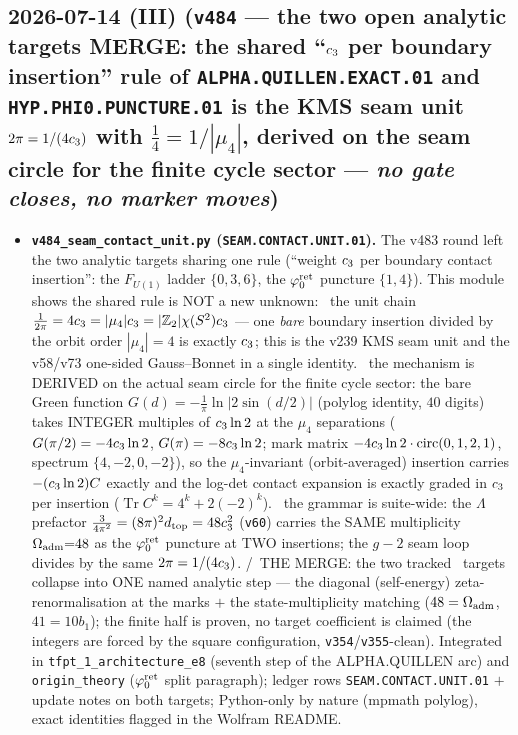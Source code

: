 \subsection*{2026-07-14 (III) (\texttt{v484} --- the two open analytic targets MERGE: the shared ``$c_3$ per boundary insertion'' rule of \texttt{ALPHA.QUILLEN.EXACT.01} and \texttt{HYP.PHI0.PUNCTURE.01} is the KMS seam unit $2\pi=1/(4c_3)$ with $\tfrac14=1/|\mu_4|$, derived on the seam circle for the finite cycle sector --- \emph{no gate closes, no marker moves})}
\begin{itemize}[leftmargin=1.5em]
\item \textbf{\texttt{v484\_seam\_contact\_unit.py} (\texttt{SEAM.CONTACT.UNIT.01}).} The v483 round left
the two analytic targets sharing one rule (``weight $c_3$ per boundary contact insertion'': the
$F_{U(1)}$ ladder $\{0,3,6\}$, the $\varphi_0^{\mathrm{ret}}$ puncture $\{1,4\}$). This module shows the shared rule is NOT
a new unknown: \mE\ the unit chain $\tfrac1{2\pi}=4c_3=|\mu_4|c_3=|\mathbb{Z}_2|\chi(S^2)c_3$ ---
one \emph{bare} boundary insertion divided by the orbit order $|\mu_4|{=}4$ is exactly $c_3$; this is
the v239 KMS seam unit and the v58/v73 one-sided Gauss--Bonnet in a single identity. \mE\ the mechanism is
DERIVED on the actual seam circle for the finite cycle sector: the bare Green function
$G(d)=-\tfrac1\pi\ln|2\sin(d/2)|$ (polylog identity, $40$ digits) takes INTEGER multiples of
$c_3\ln2$ at the $\mu_4$ separations ($G(\pi/2)=-4c_3\ln2$, $G(\pi)=-8c_3\ln2$; mark matrix
$-4c_3\ln2\cdot\mathrm{circ}(0,1,2,1)$, spectrum $\{4,-2,0,-2\}$), so the $\mu_4$-invariant
(orbit-averaged) insertion carries $-(c_3\ln2)C$ exactly and the log-det contact expansion is exactly
graded in $c_3$ per insertion ($\operatorname{Tr}C^k=4^k+2(-2)^k$). \mE\ the grammar is suite-wide:
the $\Lambda$ prefactor $\tfrac{3}{4\pi^2}=(8\pi)^2 d_{\mathrm{top}}=48c_3^2$ (\texttt{v60}) carries
the SAME multiplicity $\Omega_{\mathrm{adm}}{=}48$ as the $\varphi_0^{\mathrm{ret}}$ puncture at TWO insertions; the $g{-}2$ seam loop
divides by the same $2\pi=1/(4c_3)$. \mC/\mO\ THE MERGE: the two tracked \mO\ targets collapse into
ONE named analytic step --- the diagonal (self-energy) zeta-renormalisation at the marks $+$ the
state-multiplicity matching ($48=\Omega_{\mathrm{adm}}$, $41=10b_1$); the finite half is proven, no target coefficient is
claimed (the integers are forced by the square configuration, \texttt{v354}/\texttt{v355}-clean).
Integrated in \texttt{tfpt\_1\_architecture\_e8} (seventh step of the ALPHA.QUILLEN arc) and
\texttt{origin\_theory} ($\varphi_0^{\mathrm{ret}}$ split paragraph); ledger rows \texttt{SEAM.CONTACT.UNIT.01} $+$ update
notes on both targets; Python-only by nature (mpmath polylog), exact identities flagged in the Wolfram
README.
\end{itemize}

